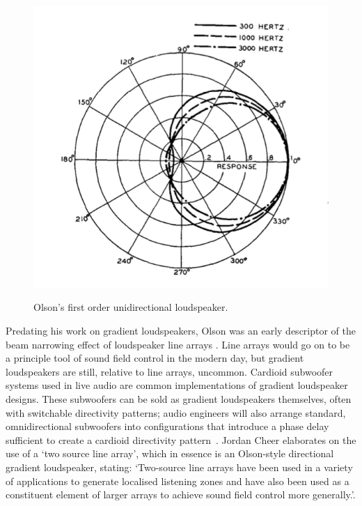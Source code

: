 \documentclass{report}
\begin{document}
        \begin{figure}[H]
            \centering
            \includegraphics[scale=0.2]{figs/olsonFirstOrderDirectivity.png}%
            \caption{Olson's first order unidirectional loudspeaker.}\cite{olson1973gradient}
            \label{olsonFirstOrderDirectivity}
        \end{figure}


        Predating his work on gradient loudspeakers, Olson was an early descriptor of the beam narrowing effect of loudspeaker line arrays \cite{olson1957acoustical}.
        Line arrays would go on to be a principle tool of sound field control in the modern day, but gradient loudspeakers are still, relative to line arrays, uncommon.
        Cardioid subwoofer systems used in live audio are common implementations of gradient loudspeaker designs.
        These subwoofers can be sold as gradient loudspeakers themselves, often with switchable directivity patterns; audio engineers will also arrange standard, omnidirectional subwoofers into configurations that introduce a phase delay sufficient to create a cardioid directivity pattern~\cite{curtis2022cardioidsubs}.
        Jordan Cheer elaborates on the use of a `two source line array', which in essence is an Olson-style directional gradient loudspeaker, stating: `Two-source line arrays have been used in a variety of applications to generate localised listening zones and have also been used as a constituent element of larger arrays to achieve sound field control more generally.'\cite{cheer2015robustness}.
\end{document}
